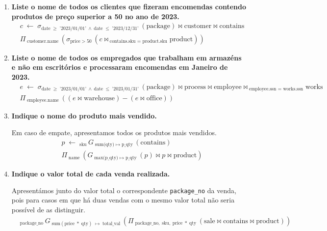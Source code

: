 \documentclass[12pt,a4paper]{article}
\newcommand{\op}{\text}
\begin{document}
  \vspace*{10pt}
  \begin{enumerate}
    \item \textbf{Liste o nome de todos os clientes que fizeram encomendas contendo produtos de preço superior a 50\textmd{\texteuro} no ano de 2023.}
    \[
      \begin{aligned}
        & c \; \leftarrow \; \sigma_{\op{date} \; \geq \; \text{'2023/01/01'} ~\land~ \op{date} \; \leq \; \text{'2023/12/31'} \;}(\op{package}) \bowtie \op{customer} \bowtie \op{contains} \\
        & \Pi _{\; \op{customer.name} \;}( \sigma _{\op{price} \; > \; \op{50} \;} (c \bowtie _{\; \op{contains.sku = product.sku}}\op{product}))
      \end{aligned}
    \]

    \item \textbf{Liste o nome de todos os empregados que trabalham em armazéns e não em escritórios e processaram encomendas em Janeiro de 2023.}
    \[
      \begin{aligned}
        & e \; \leftarrow \; \sigma_{\op{date} \; \geq \; \text{'2023/01/01'} ~\land~ \op{date} \; \leq \; \text{'2023/01/31'} \;}(\op{package}) \bowtie \op{process} \bowtie \op{employee} \bowtie _{\; \op{employee.ssn = works.ssn}} \op{works} \\
        & \Pi _{\; \op{employee.name} \;}((e \bowtie \op{warehouse}) - (e \bowtie \op{office}))
      \end{aligned}
    \]

    \item \textbf{Indique o nome do produto mais vendido.}

    Em caso de empate, apresentamos todos os produtos mais vendidos.
    \[
      \begin{aligned}
        & p \; \leftarrow \; _{\op{sku} \;} G _{\; \op{sum(qty)} \; \mapsto \; \op{p\_qty} \;}(\op{contains}) \\
        & \Pi _{\; \op{name} \;}(G _{\; \op{max(p\_qty)} \; \mapsto \; \op{p\_qty} \;}(p) \bowtie p \bowtie \op{product})
      \end{aligned}
    \]

    \item \textbf{Indique o valor total de cada venda realizada.}

    Apresentámos junto do valor total o correspondente \texttt{package\_no} da venda, pois para casos em que
    há duas vendas com o mesmo valor total não seria possível de as distinguir.
    \[
      \begin{aligned}
          & _{\op{package\_no} \;} G _{\; \op{sum}(\op{price} \; * \; \op{qty}) \; \mapsto \; \op{total\_val} \;}(\Pi _{ \; \op{package\_no}, \; \op{sku}, \; \op{price} \; * \; \op{qty} \;}(\op{sale} \bowtie \op{contains} \bowtie \op{product}))
      \end{aligned}
    \]
  \end{enumerate}
\end{document}
